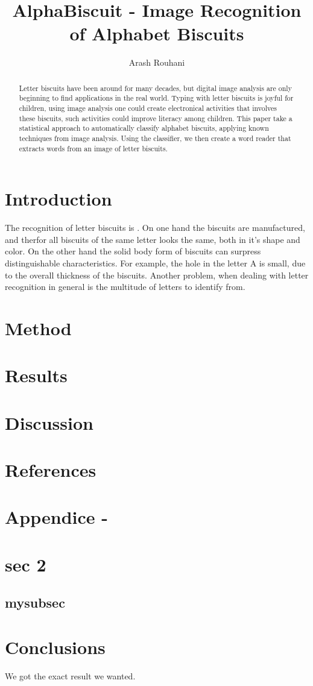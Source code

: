 \documentclass[a4paper,11pt]{article}
\title{AlphaBiscuit - Image Recognition of Alphabet Biscuits}
\author{Arash Rouhani}
\begin{document}
\maketitle

\begin{abstract}
    Letter biscuits have been around for many decades, but digital image
analysis are only beginning to find applications in the real world.
Typing with letter biscuits is joyful for children, using image analysis
one could create electronical activities that involves these biscuits,
such activities could improve literacy among children. This paper take
a statistical approach to automatically classify alphabet biscuits,
applying known techniques from image analysis. Using the classifier, we
then create a word reader that extracts words from an image of letter
biscuits.

\end{abstract}

\section{Introduction}
The recognition of letter biscuits is . 
On one hand the biscuits are manufactured, and therfor all biscuits of the same letter looks the same, both in it's shape and color.
On the other hand the solid body form of biscuits can surpress distinguishable characteristics. For example, the hole in the letter A is small, due to the overall thickness of the biscuits. Another problem, when dealing with letter recognition in general is the multitude of letters to identify from.
\section{Method}
\section{Results}
\section{Discussion}
\section{References}
\section{Appendice -}
\section{sec 2}

\subsection{mysubsec}
\section{Conclusions}
We got the exact result we wanted.
\end{document}
